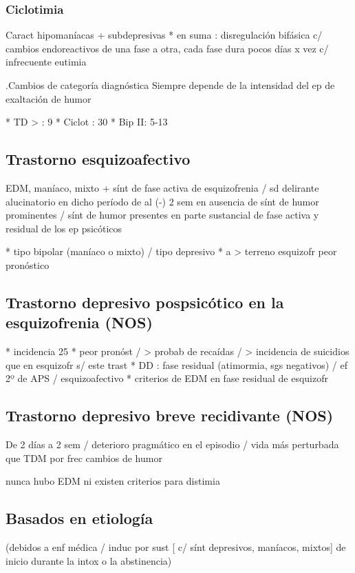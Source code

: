 \documentclass{scrbook}
\begin{document}
\subsubsection*{Ciclotimia}
Caract hipomaníacas + subdepresivas
* en suma : disregulación bifásica c/ cambios endoreactivos de una fase a otra, cada fase dura pocos días x vez c/ infrecuente eutimia

.Cambios de categoría diagnóstica
Siempre depende de la intensidad del ep de exaltación de humor

* TD > : 9%
* Ciclot : 30%
* Bip II: 5-13%

\subsection*{Trastorno esquizoafectivo}
EDM, maníaco, mixto + sínt de fase activa de esquizofrenia / sd delirante alucinatorio en dicho período de al (-) 2 sem en ausencia de sínt de humor prominentes / sínt de humor presentes en parte sustancial de fase activa y residual de los ep psicóticos

* tipo bipolar (maníaco o mixto) / tipo depresivo
* a > terreno esquizofr peor pronóstico

\subsection*{Trastorno depresivo pospsicótico en la esquizofrenia (NOS)}
* incidencia 25%
* peor pronóst / > probab de recaídas / > incidencia de suicidios que en esquizofr s/ este trast
* DD : fase residual (atimormia, sgs negativos) / ef 2º de APS / esquizoafectivo
* criterios de EDM en fase residual de esquizofr
\subsection*{Trastorno depresivo breve recidivante (NOS)}
De 2 días a 2 sem / deterioro pragmático en el episodio / vida más perturbada que TDM por frec cambios de humor

nunca hubo EDM ni existen criterios para distimia

\subsection*{Basados en etiología}

(debidos a enf médica / induc por sust [ c/ sínt depresivos, maníacos, mixtos] de inicio durante la intox o la abstinencia)
\end{document}
